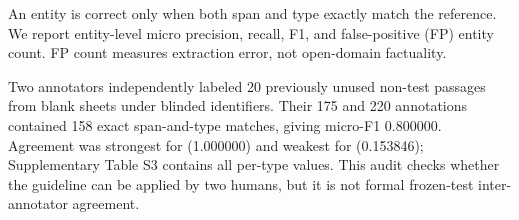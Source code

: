 An entity is correct only when both span and type exactly match the reference.
We report entity-level micro precision, recall, F1, and false-positive (FP)
entity count. FP count measures extraction error, not open-domain factuality.

Two annotators independently labeled 20 previously unused non-test passages
from blank sheets under blinded identifiers. Their 175 and 220 annotations
contained 158 exact span-and-type matches, giving micro-F1 0.800000. Agreement
was strongest for  (1.000000) and weakest for
 (0.153846); Supplementary Table S3 contains all
per-type values. This audit checks whether the guideline can be applied by two
humans, but it is not formal frozen-test inter-annotator agreement.
